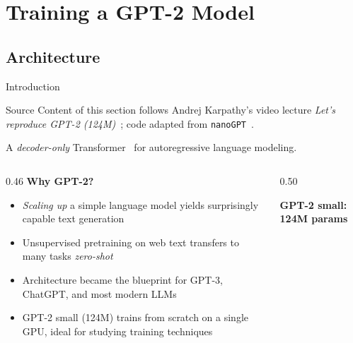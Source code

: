 

\section{Training a GPT-2 Model}

\subsection{Architecture}

\begin{frame}{Introduction}

  \begin{block}{Source}
    \small
    Content of this section follows Andrej Karpathy's video lecture \emph{Let's reproduce GPT-2 (124M)}~\cite{karpathy2024gpt2video}; code adapted from \texttt{nanoGPT}~\cite{karpathy2022nanogpt}.
  \end{block}

  \vspace{0.3em}
  A \emph{decoder-only} Transformer~\cite{radford2019gpt2} for autoregressive language modeling.

  \vspace{0.3em}
  \begin{columns}
    \begin{column}{0.46\textwidth}
      \textbf{Why GPT-2?}
      \begin{itemize}
        \item \emph{Scaling up} a simple language model yields surprisingly capable text generation
        \item Unsupervised pretraining on web text transfers to many tasks \emph{zero-shot}
        \item Architecture became the blueprint for GPT-3, ChatGPT, and most modern LLMs
        \item GPT-2 small (124M) trains from scratch on a single GPU, ideal for studying training techniques
      \end{itemize}
    \end{column}
    \begin{column}{0.50\textwidth}
      \begin{center}
      \textbf{GPT-2 small: 124M params}
      \end{center}
\end{column}
\end{columns}
\end{frame}
